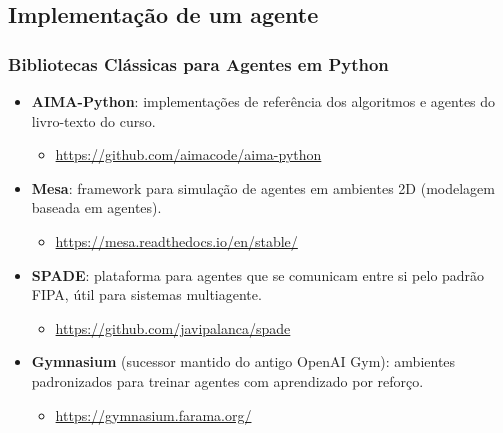 \documentclass{beamer}
\begin{document}
\subsection{Implementação de um agente}
\begin{frame}
\frametitle{Bibliotecas Clássicas para Agentes em Python}
\footnotesize
\begin{itemize}
    \item \textbf{AIMA-Python}: implementações de referência dos algoritmos e agentes do livro-texto do curso.
    \begin{itemize}
        \item \url{https://github.com/aimacode/aima-python}
    \end{itemize}
    \item \textbf{Mesa}: framework para simulação de agentes em ambientes 2D (modelagem baseada em agentes).
    \begin{itemize}
        \item \url{https://mesa.readthedocs.io/en/stable/}
    \end{itemize}
    \item \textbf{SPADE}: plataforma para agentes que se comunicam entre si pelo padrão FIPA, útil para sistemas multiagente.
    \begin{itemize}
        \item \url{https://github.com/javipalanca/spade}
    \end{itemize}
    \item \textbf{Gymnasium} (sucessor mantido do antigo OpenAI Gym): ambientes padronizados para treinar agentes com aprendizado por reforço.
    \begin{itemize}
        \item \url{https://gymnasium.farama.org/}
    \end{itemize}
\end{itemize}
\end{frame}
\end{document}
